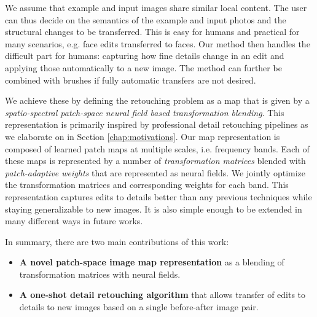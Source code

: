 We assume that example and input images share similar local content. The user can thus decide on the semantics of the example and input photos and the structural changes to be transferred. This is easy for humans and practical for many scenarios, e.g. face edits transferred to faces. Our method then handles the difficult part for humans: capturing how fine details change in an edit and applying those automatically to a new image. The method can further be combined with brushes if fully automatic transfers are not desired. 

We achieve these by defining the retouching problem as a map that is given by a \emph{spatio-spectral patch-space neural field based transformation blending}. This representation is primarily inspired by professional detail retouching pipelines as we elaborate on in Section \ref{chap:motivations}. Our map representation is composed of learned patch maps at multiple scales, i.e. frequency bands. Each of these maps is represented by a number of \emph{transformation matrices} blended with \emph{patch-adaptive weights} that are represented as neural fields. We jointly optimize the transformation matrices and corresponding weights for each band. This representation captures edits to details better than any previous techniques while staying generalizable to new images. It is also simple enough to be extended in many different ways in future works.

In summary, there are two main contributions of this work: 

\begin{itemize}

    \item \textbf{A novel patch-space image map representation} as a blending of transformation matrices with neural fields.
    
	\item \textbf{A one-shot detail retouching algorithm} that allows transfer of edits to details to new images based on a single before-after image pair.

\end{itemize}
